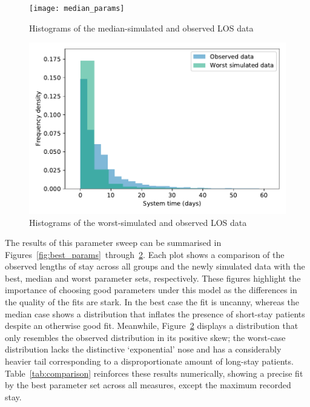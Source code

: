 \begin{figure}
    \texttt{[image: median\_params]}
    \caption{%
        Histograms of the median-simulated and observed LOS data
    }\label{fig:median_params}
\end{figure}

\begin{figure}
    \includegraphics[width=\imgwidth]{worst_params}
    \caption{%
        Histograms of the worst-simulated and observed LOS data
    }\label{fig:worst_params}
\end{figure}

The results of this parameter sweep can be summarised in
Figures~\ref{fig:best_params}~through~\ref{fig:worst_params}. Each plot shows a
comparison of the observed lengths of stay across all groups and the newly
simulated data with the best, median and worst parameter sets, respectively.
These figures highlight the importance of choosing good parameters under this
model as the differences in the quality of the fits are stark. In the best case
the fit is uncanny, whereas the median case shows a distribution that inflates
the presence of short-stay patients despite an otherwise good fit. Meanwhile,
Figure~\ref{fig:worst_params} displays a distribution that only resembles the
observed distribution in its positive skew; the worst-case distribution lacks
the distinctive `exponential' nose and has a considerably heavier tail
corresponding to a disproportionate amount of long-stay patients.
Table~\ref{tab:comparison} reinforces these results numerically, showing a
precise fit by the best parameter set across all measures, except the maximum
recorded stay.

\begin{table}
    \centering
    \resizebox{\textwidth}{!}{%
        
    }
    \caption{%
        A comparison of the observed and simulated data based on the model
        parameters and summary statistics for length of stay
    }\label{tab:comparison}
\end{table}

